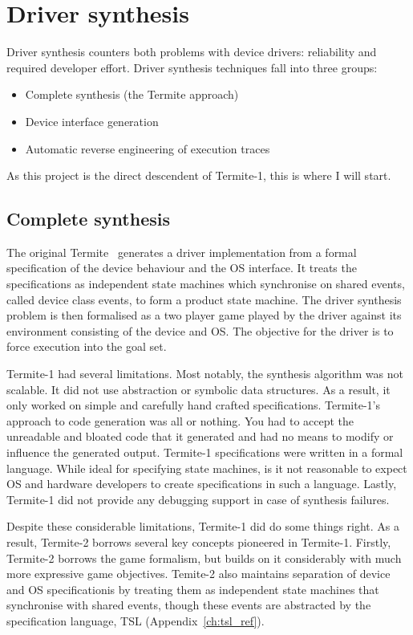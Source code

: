 \section{Driver synthesis}

Driver synthesis counters both problems with device drivers: reliability and required developer effort. Driver synthesis techniques fall into three groups:
\begin{itemize}
    \item Complete synthesis (the Termite approach)
    \item Device interface generation
    \item Automatic reverse engineering of execution traces
\end{itemize}

As this project is the direct descendent of Termite-1, this is where I will start.

\subsection{Complete synthesis}

The original Termite~\cite{Ryzhyk_CKSH_09} generates a driver implementation from a formal specification of the device behaviour and the OS interface. It treats the specifications as independent state machines which synchronise on shared events, called device class events, to form a product state machine. The driver synthesis problem is then formalised as a two player game played by the driver against its environment consisting of the device and OS. The objective for the driver is to force execution into the goal set. 

Termite-1 had several limitations. Most notably, the synthesis algorithm was not scalable. It did not use abstraction or symbolic data structures. As a result, it only worked on simple and carefully hand crafted specifications. Termite-1's approach to code generation was all or nothing. You had to accept the unreadable and bloated code that it generated and had no means to modify or influence the generated output. Termite-1 specifications were written in a formal language. While ideal for specifying state machines, is it not reasonable to expect OS and hardware developers to create specifications in such a language. Lastly, Termite-1 did not provide any debugging support in case of synthesis failures.

Despite these considerable limitations, Termite-1 did do some things right. As a result, Termite-2 borrows several key concepts pioneered in Termite-1. Firstly, Termite-2 borrows the game formalism, but builds on it considerably with much more expressive game objectives. Temite-2 also maintains separation of device and OS specificationis by treating them as independent state machines that synchronise with shared events, though these events are abstracted by the specification language, TSL (Appendix~\ref{ch:tsl_ref}).


